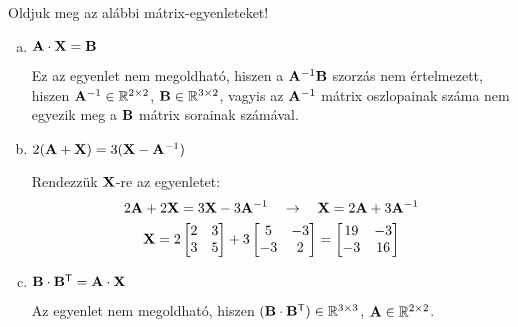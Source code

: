 \documentclass[exercise]{math-standalone}
\begin{document}
\begin{exercise}{Oldjuk meg az alábbi mátrix-egyenleteket!}
{\begin{enumerate}[a)]
            \tcbline
      \item $\mathbf{A} \cdot \mathbf{X} = \mathbf{B}$

            Ez az egyenlet nem megoldható, hiszen a $\mathbf{A}^{-1} \mathbf{B}$
            szorzás nem értelmezett, hiszen $\mathbf{A}^{-1} \in
              \mathbb R^{2 \times 2}$, $\mathbf{B} \in \mathbb R^{3 \times 2}$,
            vagyis az $\mathbf{A}^{-1}$ mátrix oszlopainak száma nem egyezik meg
            a $\mathbf{B}$ mátrix sorainak számával.

            \tcbline
      \item $2(\mathbf{A} + \mathbf{X}) = 3(\mathbf{X} - \mathbf{A}^{-1})$

            Rendezzük $\mathbf{X}$-re az egyenletet:
            \begin{gather*}
              2 \mathbf{A} + 2 \mathbf{X} = 3 \mathbf{X} - 3 \mathbf{A}^{-1}
              \quad \rightarrow \quad
              \mathbf{X} = 2 \mathbf{A} + 3 \mathbf{A}^{-1}
              \\
              \mathbf{X} = 2 \begin{bmatrix}
                2 & 3 \\ 3 & 5
              \end{bmatrix} + 3 \begin{bmatrix}
                5 & -3 \\ -3 & 2
              \end{bmatrix} = \begin{bmatrix}
                19 & -3 \\ -3 & 16
              \end{bmatrix}
            \end{gather*}

            \tcbline
      \item $\mathbf{B} \cdot \mathbf{B}^{\mathsf T} = \mathbf{A} \cdot \mathbf{X}$

            Az egyenlet nem megoldható, hiszen $(\mathbf{B} \cdot \mathbf{B}^{\mathsf T})
              \in \mathbb R^{3 \times 3}$, $\mathbf{A} \in \mathbb R^{2 \times 2}$.
    \end{enumerate}
  }
\end{exercise}
\end{document}
